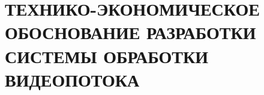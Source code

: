 \section{ТЕХНИКО-ЭКОНОМИЧЕСКОЕ ОБОСНОВАНИЕ РАЗРАБОТКИ СИСТЕМЫ ОБРАБОТКИ ВИДЕОПОТОКА}
\label{sec:economics}
















